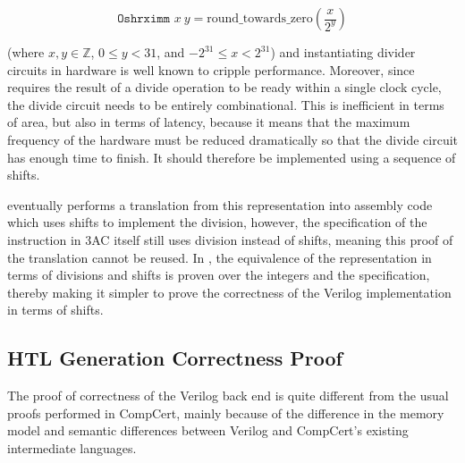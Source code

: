 \begin{equation*}
  \texttt{Oshrximm } x\ y = \text{round\_towards\_zero}\left(\frac{x}{2^{y}}\right)
\end{equation*}

(where $x, y \in \mathbb{Z}$, $0 \leq y < 31$, and $-2^{31} \leq x < 2^{31}$)
and instantiating divider circuits in hardware is well known to cripple
performance. Moreover, since \vericert{} requires the result of a divide
operation to be ready within a single clock cycle, the divide circuit needs to
be entirely combinational. This is inefficient in terms of area, but also in
terms of latency, because it means that the maximum frequency of the hardware
must be reduced dramatically so that the divide circuit has enough time to
finish.  It should therefore be implemented using a sequence of shifts.

\compcert{} eventually performs a translation from this representation into
assembly code which uses shifts to implement the division, however, the
specification of the instruction in 3AC itself still uses division instead of
shifts, meaning this proof of the translation cannot be reused.  In \vericert{},
the equivalence of the representation in terms of divisions and shifts is proven
over the integers and the specification, thereby making it simpler to prove the
correctness of the Verilog implementation in terms of shifts.

\subsection{HTL Generation Correctness Proof}%
\label{sec:hg:htl-generation-correctness-proof}



The proof of correctness of the Verilog back end is quite different from the
usual proofs performed in CompCert, mainly because of the difference in the
memory model and semantic differences between Verilog and CompCert's existing
intermediate languages.

